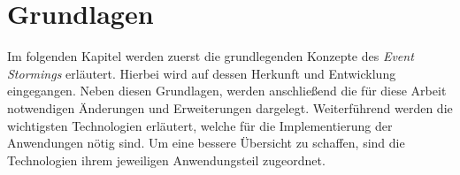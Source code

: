 \chapter{Grundlagen}\label{ch:grundlagen}
Im folgenden Kapitel werden zuerst die grundlegenden Konzepte des \textit{Event Stormings} erläutert.
Hierbei wird auf dessen Herkunft und Entwicklung eingegangen.
Neben diesen Grundlagen, werden anschließend die für diese Arbeit notwendigen Änderungen und Erweiterungen dargelegt.
Weiterführend werden die wichtigsten Technologien erläutert, welche für die Implementierung der Anwendungen nötig sind.
Um eine bessere Übersicht zu schaffen, sind die Technologien ihrem jeweiligen Anwendungsteil zugeordnet.




